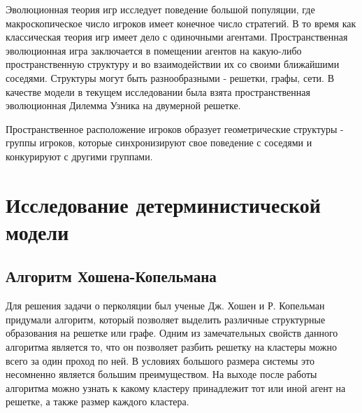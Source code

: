 \documentclass[12pt,a4paper]{article}
\begin{document}
	\par Эволюционная теория игр исследует поведение большой популяции, где макроскопическое
	число игроков имеет конечное число стратегий. В то время как классическая теория игр имеет дело с одиночными агентами. Пространственная эволюционная игра заключается в помещении агентов на какую-либо пространственную структуру и во взаимодействии их со своими ближайшими соседями. Структуры могут быть разнообразными - решетки, графы, сети. В качестве модели в текущем исследовании была взята пространственная эволюционная Дилемма Узника на двумерной решетке.
	
	\par Пространственное расположение игроков образует геометрические структуры - группы игроков, которые синхронизируют свое поведение с соседями и конкурируют с другими группами.
	 
	\section{Исследование детерминистической модели}
	
	\subsection{Алгоритм Хошена-Копельмана}
	
	\par Для решения задачи о перколяции был ученые Дж. Хошен и Р. Копельман придумали алгоритм, который позволяет выделить различные структурные образования на решетке или графе. Одним из замечательных свойств данного алгоритма является то, что он позволяет разбить решетку на кластеры можно всего за один проход по ней. В условиях большого размера системы это несомненно является большим преимуществом. На выходе после работы алгоритма можно узнать к какому кластеру принадлежит тот или иной агент на решетке, а также размер каждого кластера.
	
\end{document}
